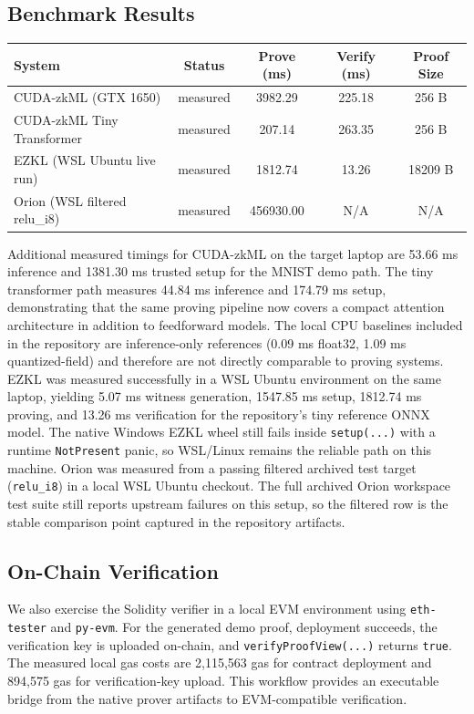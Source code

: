 \documentclass[11pt,a4paper]{article}
\begin{document}
\subsection{Benchmark Results}

\begin{tabular}{lcccc}
\toprule
System & Status & Prove (ms) & Verify (ms) & Proof Size \\
\midrule
CUDA-zkML (GTX 1650) & measured & 3982.29 & 225.18 & 256 B \\
CUDA-zkML Tiny Transformer & measured & 207.14 & 263.35 & 256 B \\
EZKL (WSL Ubuntu live run) & measured & 1812.74 & 13.26 & 18209 B \\
Orion (WSL filtered relu\_i8) & measured & 456930.00 & N/A & N/A \\
\bottomrule
\end{tabular}

Additional measured timings for CUDA-zkML on the target laptop are
53.66 ms inference and 1381.30 ms trusted setup for the MNIST demo path.
The tiny transformer path measures 44.84 ms inference and 174.79 ms setup,
demonstrating that the same proving pipeline now covers a compact attention
architecture in addition to feedforward models. The local CPU baselines
included in the repository are inference-only references
(0.09 ms float32, 1.09 ms quantized-field) and therefore are not directly
comparable to proving systems. EZKL was measured successfully in a WSL Ubuntu
environment on the same laptop, yielding 5.07 ms witness generation,
1547.85 ms setup, 1812.74 ms proving, and 13.26 ms verification for the
repository's tiny reference ONNX model. The native Windows EZKL wheel still
fails inside \texttt{setup(...)} with a runtime \texttt{NotPresent} panic, so
WSL/Linux remains the reliable path on this machine. Orion was measured from a
passing filtered archived test target (\texttt{relu\_i8}) in a local WSL Ubuntu
checkout. The full archived Orion workspace test suite still reports upstream
failures on this setup, so the filtered row is the stable comparison point
captured in the repository artifacts.

\subsection{On-Chain Verification}

We also exercise the Solidity verifier in a local EVM environment using
\texttt{eth-tester} and \texttt{py-evm}. For the generated demo proof,
deployment succeeds, the verification key is uploaded on-chain, and
\texttt{verifyProofView(...)} returns \texttt{true}. The measured local
gas costs are 2,115,563 gas for contract deployment and 894,575 gas for
verification-key upload. This workflow provides an executable bridge from
the native prover artifacts to EVM-compatible verification.
\end{document}
